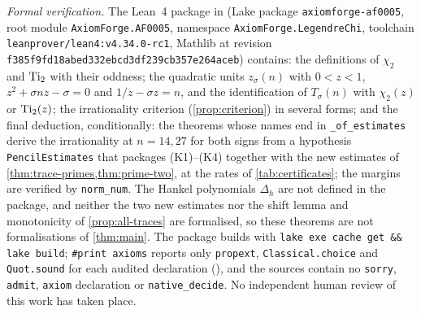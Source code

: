 \emph{Formal verification.} The Lean~4 package in  (Lake package \texttt{axiomforge-af0005}, root module
\texttt{AxiomForge.AF0005}, namespace \texttt{AxiomForge.LegendreChi}, toolchain \texttt{leanprover/lean4:v4.34.0-rc1}, Mathlib
at revision \texttt{f385f9fd18abed332ebcd3df239cb357e264aceb}) contains: the definitions of $\chi_2$ and $\operatorname{Ti}_2$ with
their oddness; the quadratic units $z_\sigma(n)$ with $0<z<1$, $z^2+\sigma nz-\sigma=0$ and $1/z-\sigma z=n$, and the
identification of $T_\sigma(n)$ with $\chi_2(z)$ or $\operatorname{Ti}_2(z)$; the irrationality criterion (\cref{prop:criterion}) in
several forms; and the final deduction, conditionally: the theorems whose names end in \texttt{\_of\_estimates} derive the
irrationality at $n=14,27$ for both signs from a hypothesis \texttt{PencilEstimates} that packages (K1)--(K4) together with the
new estimates of \cref{thm:trace-primes,thm:prime-two}, at the rates of \cref{tab:certificates}; the margins are verified by
\texttt{norm\_num}. The Hankel polynomials $\Delta_h$ are not defined in the package, and neither the two new estimates nor
the shift lemma and monotonicity of \cref{prop:all-traces} are formalised, so these theorems are not formalisations of
\cref{thm:main}. The package builds with \texttt{lake exe cache get \&\& lake build}; \texttt{\#print axioms} reports only
\texttt{propext}, \texttt{Classical.choice} and \texttt{Quot.sound} for each audited declaration (),
and the sources contain no \texttt{sorry}, \texttt{admit}, \texttt{axiom} declaration or \texttt{native\_decide}.
No independent human review of this work has taken place.
